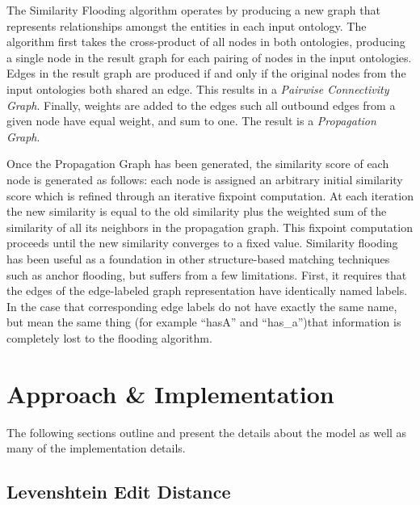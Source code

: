 \documentclass[letterpaper,twocolumn,12pt]{article}
\begin{document}
The Similarity Flooding algorithm operates by producing a new graph that represents relationships amongst the entities in each input ontology. 
The algorithm first takes the cross-product of all nodes in both ontologies, producing a single node in the result graph for each pairing of nodes in the input ontologies. 
Edges in the result graph are produced if and only if the original nodes from the input ontologies both shared an edge. 
This results in a \textit{Pairwise Connectivity Graph}.
Finally, weights are added to the edges such all outbound edges from a given node have equal weight, and sum to one. 
The result is a \textit{Propagation Graph}.

Once the Propagation Graph has been generated, the similarity score of each node is generated as follows: each node is assigned an arbitrary initial similarity
score which is refined through an iterative fixpoint computation. 
At each iteration the new similarity is equal to the old similarity plus the weighted sum of the similarity of all its neighbors in the propagation graph. 
This fixpoint computation proceeds until the new similarity converges to a fixed value.
%
Similarity flooding has been useful as a foundation in other structure-based matching techniques such as anchor flooding, but suffers from a few limitations. 
First, it requires that the edges of the edge-labeled graph representation have identically named labels. 
In the case that corresponding edge labels do not have exactly the same name, but mean the same thing (for example ``hasA'' and ``has\_a'')that information is completely lost to the flooding algorithm. 


\section{Approach \& Implementation}
\label{sec:approach}

The following sections outline and present the details about the model as well as many of the implementation details.

\subsection{Levenshtein Edit Distance}
\end{document}
